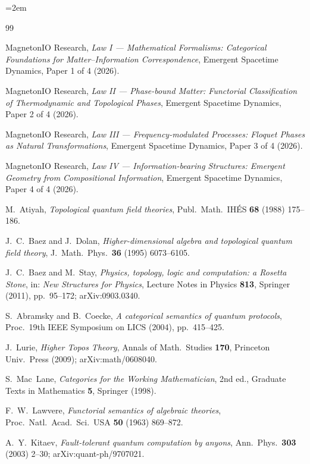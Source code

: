 \documentclass[12pt]{article}
\theoremstyle{definition}
\theoremstyle{remark}
\begin{document}
\emergencystretch=2em
\begin{thebibliography}{99}

MagnetonIO Research,
\emph{Law I --- Mathematical Formalisms: Categorical Foundations for
  Matter--Information Correspondence},
Emergent Spacetime Dynamics, Paper 1 of 4 (2026).

MagnetonIO Research,
\emph{Law II --- Phase-bound Matter: Functorial Classification of
  Thermodynamic and Topological Phases},
Emergent Spacetime Dynamics, Paper 2 of 4 (2026).

MagnetonIO Research,
\emph{Law III --- Frequency-modulated Processes: Floquet Phases as
  Natural Transformations},
Emergent Spacetime Dynamics, Paper 3 of 4 (2026).

MagnetonIO Research,
\emph{Law IV --- Information-bearing Structures: Emergent Geometry from
  Compositional Information},
Emergent Spacetime Dynamics, Paper 4 of 4 (2026).

M.~Atiyah,
\emph{Topological quantum field theories},
Publ.\ Math.\ IH\'ES \textbf{68} (1988) 175--186.

J.~C.~Baez and J.~Dolan,
\emph{Higher-dimensional algebra and topological quantum field theory},
J.\ Math.\ Phys.\ \textbf{36} (1995) 6073--6105.

J.~C.~Baez and M.~Stay,
\emph{Physics, topology, logic and computation: a Rosetta Stone},
in: \emph{New Structures for Physics}, Lecture Notes in Physics
\textbf{813}, Springer (2011), pp.~95--172; arXiv:0903.0340.

S.~Abramsky and B.~Coecke,
\emph{A categorical semantics of quantum protocols},
Proc.\ 19th IEEE Symposium on LICS (2004), pp.~415--425.

J.~Lurie,
\emph{Higher Topos Theory},
Annals of Math.\ Studies \textbf{170}, Princeton Univ.\ Press (2009);
arXiv:math/0608040.

S.~Mac~Lane,
\emph{Categories for the Working Mathematician}, 2nd ed.,
Graduate Texts in Mathematics \textbf{5}, Springer (1998).

F.~W.~Lawvere,
\emph{Functorial semantics of algebraic theories},
Proc.\ Natl.\ Acad.\ Sci.\ USA \textbf{50} (1963) 869--872.

A.~Y.~Kitaev,
\emph{Fault-tolerant quantum computation by anyons},
Ann.\ Phys.\ \textbf{303} (2003) 2--30; arXiv:quant-ph/9707021.


\end{thebibliography}
\end{document}
